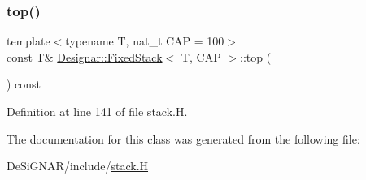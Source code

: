\subsubsection{\texorpdfstring{top()}{top()}\hspace{0.1cm}{\footnotesize\ttfamily [2/2]}}
{\footnotesize\ttfamily template$<$typename T, nat\+\_\+t C\+AP = 100$>$ \\
const T\& \hyperlink{class_designar_1_1_fixed_stack}{Designar\+::\+Fixed\+Stack}$<$ T, C\+AP $>$\+::top (\begin{DoxyParamCaption}{ }\end{DoxyParamCaption}) const\hspace{0.3cm}{\ttfamily [inline]}}



Definition at line 141 of file stack.\+H.



The documentation for this class was generated from the following file\+:\begin{DoxyCompactItemize}
\item 
De\+Si\+G\+N\+A\+R/include/\hyperlink{stack_8_h}{stack.\+H}\end{DoxyCompactItemize}
